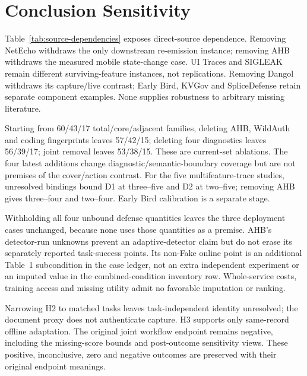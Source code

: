 \section{Conclusion Sensitivity}\label{app:claim-sensitivity}\label{sec:claim-sensitivity}
Table~\ref{tab:source-dependencies} exposes direct-source dependence. Removing NetEcho withdraws the only downstream re-emission instance; removing AHB withdraws the measured mobile state-change case. UI Traces and SIGLEAK remain different surviving-feature instances, not replications. Removing Dangol withdraws its capture/live contrast; Early Bird, KVGov and SpliceDefense retain separate component examples. None supplies robustness to arbitrary missing literature.

Starting from 60/43/17 total/core/adjacent families, deleting AHB, WildAuth and coding fingerprints leaves 57/42/15; deleting four diagnostics leaves 56/39/17; joint removal leaves 53/38/15. These are current-set ablations. The four latest additions change diagnostic/semantic-boundary coverage but are not premises of the cover/action contrast. For the five multifeature-trace studies, unresolved bindings bound D1 at three--five and D2 at two--five; removing AHB gives three--four and two--four. Early Bird calibration is a separate stage.

Withholding all four unbound defense quantities leaves the three deployment cases unchanged, because none uses those quantities as a premise. AHB's detector-run unknowns prevent an adaptive-detector claim but do not erase its separately reported task-success points. Its non-Fake online point is an additional Table~1 subcondition in the case ledger, not an extra independent experiment or an imputed value in the combined-condition inventory row. Whole-service costs, training access and missing utility admit no favorable imputation or ranking.

Narrowing H2 to matched tasks leaves task-independent identity unresolved; the document proxy does not authenticate capture. H3 supports only same-record offline adaptation. The original joint workflow endpoint remains negative, including the missing-score bounds and post-outcome sensitivity views. These positive, inconclusive, zero and negative outcomes are preserved with their original endpoint meanings.
